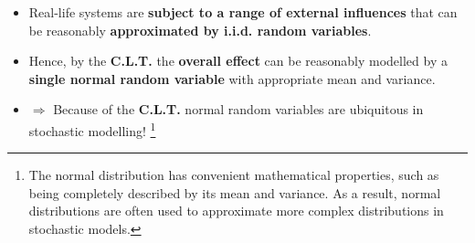 \begin{itemize}[label=\textbullet]
    \item Real-life systems are \textbf{subject to a range of external influences} that can be reasonably \textbf{approximated by i.i.d. random variables}.
    \item Hence, by the \textbf{C.L.T.} the \textbf{overall effect} can be reasonably modelled by a \textbf{single normal random variable} with appropriate mean and variance.
    \item \(\Rightarrow\) Because of the \textbf{C.L.T.} normal random variables are ubiquitous in stochastic modelling! \footnote[]{The normal distribution has convenient mathematical properties, such as being completely described by its mean and variance. As a result, normal distributions are often used to approximate more complex distributions in stochastic models.}
\end{itemize}
